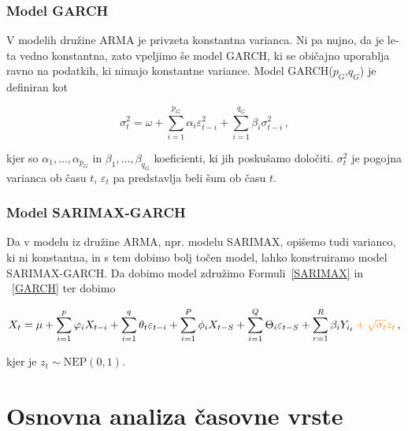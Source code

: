 \documentclass[a4paper, 11pt]{article}
\begin{document}
\subsubsection{Model GARCH}

V modelih družine ARMA je privzeta konstantna varianca. Ni pa nujno, da je le-ta vedno konstantna, zato
vpeljimo še model GARCH, ki se običajno uporablja ravno na podatkih, ki nimajo konstantne variance. 
Model GARCH($p_G$,$q_G$) je definiran kot

\begin{equation}
    \label{GARCH}
    \sigma^2_t = \omega + \sum_{i=1}^{p_G}{\alpha_i \varepsilon_{t-i}^2} + \sum_{i=1}^{q_G}{\beta_i \sigma_{t-i}^2} \,,
\end{equation}

\noindent kjer so $\alpha_1, \dots, \alpha_{p_G}$ in $\beta_1, \dots, \beta_{q_G}$ koeficienti, ki 
jih poskušamo določiti. $\sigma^2_t$ je pogojna varianca ob času $t$, $\varepsilon_t$ pa predstavlja beli šum
ob času $t$. \cite{ArimaGarch}

\subsubsection{Model SARIMAX-GARCH}

\noindent Da v modelu iz družine ARMA, npr. modelu SARIMAX, opišemo tudi varianco, ki ni konstantna, in s tem dobimo bolj
točen model, lahko 
konstruiramo model SARIMAX-GARCH. Da dobimo model združimo Formuli~\eqref{SARIMAX} in ~\eqref{GARCH} ter dobimo

\begin{equation}
    \label{SARIMAX_GARCH}
    X_t = \mu + \sum_{i=1}^{p}{\varphi_i X_{t-i}} + \sum_{i=1}^{q}{\theta_t \varepsilon_{t-i}} + \sum_{i=1}^{P}{\phi_i X_{t-S}} + \sum_{i=1}^{Q}{\Theta_i \varepsilon_{t-S}}  + \sum_{r=1}^{R}{\beta_i Y_{i_{t}}} \color{orange} + \sqrt{\sigma_t} z_t \color{black} \,,
\end{equation}

\noindent kjer je $z_t \sim \text{NEP}(0,1)$. \cite{ArimaGarch}




\pagebreak

\section{Osnovna analiza časovne vrste}
\end{document}
